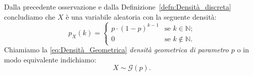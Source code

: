             \begin{defn}
                Dalla precedente osservazione e dalla Definizione~\ref{defn:Densità_discreta} concludiamo che $X$ è una variabile aleatoria con la seguente densità:
                \begin{equation}\label{eq:Densità_Geometrica}
                    p_X(k) = \begin{cases}
                        p \cdot (1-p)^{k-1} & \text{se $k \in \mathbb{N}$;} \\
                        0 & \text{se $k \notin \mathbb{N}$.}
                    \end{cases}
                \end{equation}
                Chiamiamo la \eqref{eq:Densità_Geometrica} \emph{densità geometrica di parametro $p$} o in modo equivalente indichiamo: \[
                    X \sim \mathcal{G}(p)
                .\] 
            \end{defn}
